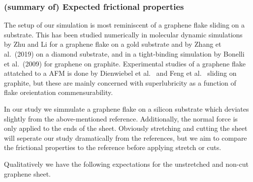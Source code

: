 \subsubsection{(summary of) Expected frictional properties}


The setup of our simulation is most reminiscent of a graphene flake sliding on a substrate. This has been studied numerically in molecular dynamic simulations by Zhu and Li \cite[2018]{zhu_study_2018} for a graphene flake on a gold substrate and by Zhang et al.\ \cite{ma12091425}(2019) on a diamond substrate, and in a tight-binding simulation by Bonelli et al.\ \cite{bonelli_atomistic_2009}(2009) for graphene on graphite. Experimental studies of a graphene flake attatched to a AFM is done by Dienwiebel et al.\ \cite[2005]{DIENWIEBEL2005197} and Feng et al.\ \cite[2013]{feng_superlubric_2013} sliding on graphite, but these are mainly concerned with superlubricity as a function of flake oreientation commensurability. 


In our study we simmulate a graphene flake on a silicon substrate which deviates slightly from the above-mentioned reference. Additionally, the normal force is only applied to the ends of the sheet. Obviously stretching and cutting the sheet will seperate our study dramatically from the references, but we aim to compare the frictional properties to the reference before applying stretch or cuts. 

Qualitatively we have the following expectations for the unstretched and non-cut graphene sheet. 



